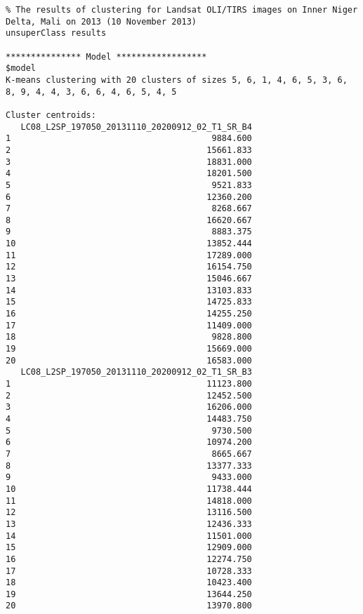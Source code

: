 \begin{scriptsize}
\begin{verbatim}
% The results of clustering for Landsat OLI/TIRS images on Inner Niger Delta, Mali on 2013 (10 November 2013)
unsuperClass results

*************** Model ******************
$model
K-means clustering with 20 clusters of sizes 5, 6, 1, 4, 6, 5, 3, 6, 8, 9, 4, 4, 3, 6, 6, 4, 6, 5, 4, 5

Cluster centroids:
   LC08_L2SP_197050_20131110_20200912_02_T1_SR_B4
1                                        9884.600
2                                       15661.833
3                                       18831.000
4                                       18201.500
5                                        9521.833
6                                       12360.200
7                                        8268.667
8                                       16620.667
9                                        8883.375
10                                      13852.444
11                                      17289.000
12                                      16154.750
13                                      15046.667
14                                      13103.833
15                                      14725.833
16                                      14255.250
17                                      11409.000
18                                       9828.800
19                                      15669.000
20                                      16583.000
   LC08_L2SP_197050_20131110_20200912_02_T1_SR_B3
1                                       11123.800
2                                       12452.500
3                                       16206.000
4                                       14483.750
5                                        9730.500
6                                       10974.200
7                                        8665.667
8                                       13377.333
9                                        9433.000
10                                      11738.444
11                                      14818.000
12                                      13116.500
13                                      12436.333
14                                      11501.000
15                                      12909.000
16                                      12274.750
17                                      10728.333
18                                      10423.400
19                                      13644.250
20                                      13970.800

\end{verbatim}
\end{scriptsize}
